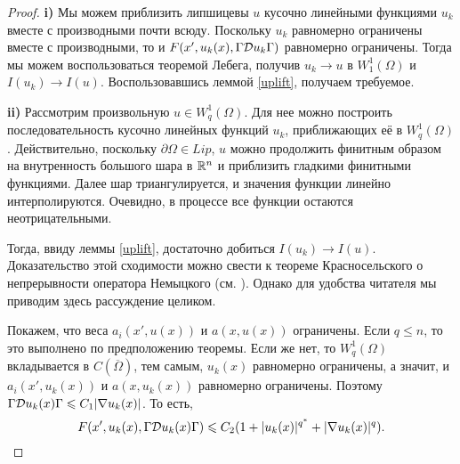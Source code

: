 \begin{proof}
\textbf{\textup{i)}} Мы можем приблизить липшицевы $u$ кусочно линейными функциями $u_k$ вместе с производными почти всюду.
Поскольку $u_k$ равномерно ограничены вместе с производными,
то и $F(x', u_k(x), \norm{\mathcal{D} u_k})$ равномерно ограничены.
Тогда мы можем воспользоваться теоремой Лебега, получив $u_k \to u$ в $W^1_1(\Omega)$ и $I( u_k ) \to I( u )$.
Воспользовавшись леммой \ref{uplift}, получаем требуемое.

\textbf{\textup{ii)}} Рассмотрим произвольную $u \in W^1_q(\Omega)$.
Для нее можно построить последовательность кусочно линейных функций $u_k$, приближающих её в $W^1_q(\Omega)$.
Действительно, поскольку $\partial \Omega \in Lip$,
$u$ можно продолжить финитным образом на внутренность большого шара в $\mathbb R^n$
и приблизить гладкими финитными функциями.
Далее шар триангулируется, и значения функции линейно интерполируются.
Очевидно, в процессе все функции остаются неотрицательными.

Тогда, ввиду леммы \ref{uplift}, достаточно добиться $I( u_k ) \to I( u )$.
Доказательство этой сходимости можно свести к теореме Красносельского о непрерывности
оператора Немыцкого (см. \cite[гл. 5, ]{Krasnoselsky}).
Однако для удобства читателя мы приводим здесь рассуждение целиком.

Покажем, что веса $a_i(x', u(x))$ и $a(x, u(x))$ ограничены.
Если $q \le n$, то это выполнено по предположению теоремы. Если же нет, то $W^1_q(\Omega)$ вкладывается в $C(\overline{\Omega})$,
тем самым, $u_k(x)$ равномерно ограничены, а значит, и $a_i(x', u_k(x))$ и $a(x, u_k(x))$ равномерно ограничены.
Поэтому $\norm{ \mathcal{D} u_k( x ) } \le C_1 |\nabla u_k( x )|$.
То есть,
$$F( x', u_k( x ), \norm{ \mathcal{D} u_k( x ) } ) \le C_2 ( 1 + |u_k( x )|^{q^*} + |\nabla u_k( x )|^q ).$$



\end{proof}
